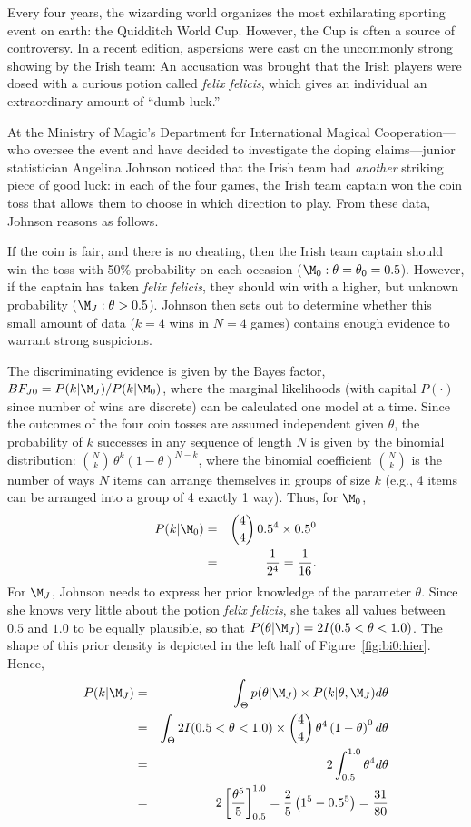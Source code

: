 \label{ex:irish}
Every four years, the wizarding world organizes the most exhilarating sporting event on earth: the Quidditch World Cup.  However, the Cup is often a source of controversy. In a recent edition, aspersions were cast on the uncommonly strong showing by the Irish team: An accusation was brought that the Irish players were dosed with a curious potion called \emph{felix felicis}, which gives an individual an extraordinary amount of ``dumb luck.''

At the Ministry of Magic's Department for International Magical Cooperation---who oversee the event and have decided to investigate the doping claims---junior statistician Angelina Johnson noticed that the Irish team had \emph{another} striking piece of good luck: in each of the four games, the Irish team captain won the coin toss that allows them to choose in which direction to play.  From these data, Johnson reasons as follows.

If the coin is fair, and there is no cheating, then the Irish team captain should win the toss with 50\% probability on each occasion ($\M_0: \theta =\theta_0= 0.5$). However, if the captain has taken \textit{felix felicis}, they should win with a higher, but unknown probability ($\M_J: \theta > 0.5$). Johnson then sets out to determine whether this small amount of data ($k=4$ wins in $N=4$ games) contains enough evidence to warrant strong suspicions.

The discriminating evidence is given by the Bayes factor, $BF_{J0}=P(k|\M_J)/P(k|\M_0)$, where the marginal likelihoods (with capital $P(\cdot)$ since number of wins are discrete) can be calculated one model at a time. Since the outcomes of the four coin tosses are assumed independent given $\theta$, the probability of $k$ successes in any sequence of length $N$ is given by the binomial distribution: $\binom{N}{k}\,\theta^k(1-\theta)^{N-k}$, where the binomial coefficient $\binom{N}{k}$ is the number of ways $N$ items can arrange themselves in groups of size $k$ (e.g., 4 items can be arranged into a group of 4 exactly 1 way). Thus, for $\M_0$, 
\begin{eqnarray*}
P(k|\M_0) &=& \binom{4}{4}\, 0.5^4 \times 0.5^0\\
&=& \frac{1}{2^{4}} = \frac{1}{16}.
\end{eqnarray*}
For $\M_J$, Johnson needs to express her prior knowledge of the parameter $\theta$. Since she knows very little about the potion \emph{felix felicis}, she takes all values between $0.5$ and $1.0$ to be equally plausible, so that $P(\theta|\M_J) = 2 I(0.5<\theta<1.0)$. {The shape of this prior density is depicted in the left half of Figure~\ref{fig:bi0:hier}.}
Hence,
\begin{eqnarray*}
P(k|\M_J) &=& \int_{\Theta} p(\theta|\M_J) \times P(k|\theta,\M_J) d \theta
\\
&=& \int_{\Theta} 2I(0.5<\theta<1.0) \times \binom{4}{4}\, \theta^4 \left(1-\theta\right)^0 d \theta \\
&=& 2\int_{0.5}^{1.0} \theta^4 d \theta \\
 &=& 2\left[\frac{\theta^5}{5} \right]_{0.5}^{1.0} 
= \frac{2}{5} \left( 1^5 - 0.5^{5} \right)
 = \frac{31}{80}
\end{eqnarray*}

